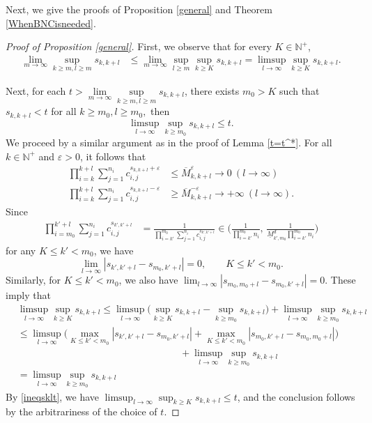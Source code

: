 \documentclass[12pt]{amsart}
\numberwithin{equation}{section}
\theoremstyle{plain}
\theoremstyle{remark}
\theoremstyle{definition}
\newcommand{\om}{\overline{M}}
\newcommand{\um}{\underline{M}}
\newcommand{\N}{\mathbb{N}}
\newcommand{\eps}{\varepsilon}
\renewcommand{\ge}{\geqslant}
\renewcommand{\le}{\leqslant}
\renewcommand{\leq}{\leqslant}
\begin{document}
Next, we give the proofs of Proposition \ref{general} and  Theorem \ref{WhenBNCisneeded}. 
	\begin{proof}[Proof of Proposition \ref{general}]
		First, we observe that for every $K\in \N^+$,
		\begin{align*}
			\lim\limits_{m\to \infty}\sup_{k\ge m,l\ge m}s_{k,k+l}
			&\le\lim\limits_{m\to \infty}\sup_{l\ge m}\sup_{k\ge K}s_{k,k+l}    
			=\limsup_{l\to\infty}\sup_{k\ge K} s_{k,k+l}.
		\end{align*}
		
		Next, for each $t>\lim\limits_{m\to \infty}\sup\limits_{k\ge m,l\ge m}s_{k,k+l}$,  there exists $m_0>K$ such that $	s_{k,k+l}<t$
		for all $ k\ge m_0,l\ge m_0, $ then
		\begin{equation} \label{ineqsklt}
			\limsup_{l\to\infty}\sup_{k\ge m_0} s_{k,k+l} \leq t.
		\end{equation}
	We proceed by a similar argument as in the proof of Lemma \ref{t=t^*}. For all  $k\in \N^+$ and $\eps>0$, it follows that
		\begin{align*}
			\prod_{i=k}^{k+l}\sum_{j=1}^{n_i}c_{i,j}^{s_{k,k+l}+\eps}
			&\le \om_{k,k+l}^\eps\to 0\ (l\to\infty)\\ 
			\prod_{i=k}^{k+l}\sum_{j=1}^{n_i}c_{i,j}^{s_{k,k+l}-\eps} 
			&\ge \om_{k,k+l}^{-\eps}\to +\infty\ (l\to\infty).
		\end{align*}
		Since 
		\begin{align*}
			\prod_{i=m_0}^{k'+l}\sum_{j=1}^{n_i}c_{i,j}^{s_{k',k'+l}}
			&=\frac1{\prod_{i=k'}^{m_0}\sum_{j=1}^{n_i}c_{i,j}^{s_{k',k'+l}}}\in \Big(\frac1{\prod_{i=k'}^{m_0}n_i},\,\frac1{\um_{k',m_0}^{d}\prod_{i=k'}^{m_0}n_i}\Big)
		\end{align*}
		for any $K\le k'<m_0$, we have 
		\[
		\lim_{l\to\infty} |s_{k',k'+l}-s_{m_0,k'+l}|=0,\qquad K\le k'<m_0. 
		\]	
		Similarly, for $K\le k'<m_0$, we also have $	\lim_{l\to \infty}|s_{m_0,m_0+l}-s_{m_0,k'+l}|=0$. These imply that 
		\begin{align*}
			&\limsup_{l\to\infty}\sup_{k\ge K} s_{k,k+l} \le \limsup_{l\to\infty} \big(\sup_{k\ge K}s_{k,k+l}-\sup_{k\ge m_0}s_{k,k+l}\big)+\limsup_{l\to\infty}\sup_{k\ge m_0}s_{k,k+l}\\
			&\le\limsup_{l\to\infty}\big(\max_{K\le k'<m_0}\left|s_{k',k'+l}-s_{m_0,k'+l}\right|+\max_{K\le k'<m_0}\left|s_{m_0,k'+l}-s_{m_0,m_0+l}\right|\big)  \\
			&\hspace{7cm}+\limsup_{l\to\infty}\sup_{k\ge m_0}s_{k,k+l}\\
			&=\limsup_{l\to\infty}\sup_{k\ge m_0}s_{k,k+l}
		\end{align*}
		By \eqref{ineqsklt}, we have $\limsup_{l\to\infty}\sup_{k\ge K} s_{k,k+l}\leq t$, and the conclusion follows by the arbitrariness of the choice of $t$.
	\end{proof}
\end{document}

